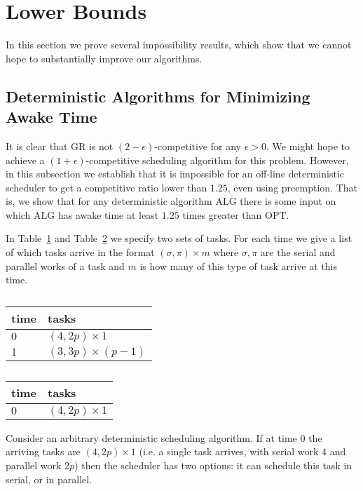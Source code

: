 \section{Lower Bounds}
\label{sec:lowerbounds}

In this section we prove several impossibility results, which
show that we cannot hope to substantially improve our algorithms.

\subsection{Deterministic Algorithms for Minimizing Awake Time}
It is clear that GR is not $(2-\epsilon)$-competitive for any
$\epsilon > 0$. We might hope to achieve a
$(1+\epsilon)$-competitive scheduling algorithm for this problem.
However, in this subsection we establish that it is impossible
for an off-line deterministic scheduler to get a competitive
ratio lower than $1.25$, even using preemption. That is, we show
that for any deterministic algorithm ALG there is some input on
which ALG has awake time at least $1.25$ times greater than OPT. 

In Table~\ref{tab:lowerboundFork1} and
Table~\ref{tab:lowerboundFork2} we specify two sets of tasks.
For each time we give a list of which tasks arrive in the format
$(\sigma, \pi)\times m$ where $\sigma, \pi$ are the serial and
parallel works of a task and $m$ is how many of this type of task
arrive at this time.

\begin{table}[H]
\caption{}
\label{tab:lowerboundFork1}
\centering
\begin{tabular}{|l|l|}
\hline
time & tasks                    \\ \hline
$0$  & $(4, 2p) \times 1$       \\ \hline
$1$  & $(3, 3p) \times (p-1)$ \\ \hline
\end{tabular}
\end{table}

\begin{table}[H]
\caption{}
\label{tab:lowerboundFork2}
\centering
\begin{tabular}{|l|l|}
\hline
time & tasks                    \\ \hline
$0$  & $(4, 2p) \times 1$       \\ \hline
\end{tabular}
\end{table}

Consider an arbitrary deterministic scheduling algorithm. If at
time $0$ the arriving tasks are $(4, 2p)\times 1$ (i.e. a single
task arrives, with serial work $4$ and parallel work $2p$) then
the scheduler has two options: it can schedule this task in
serial, or in parallel.


